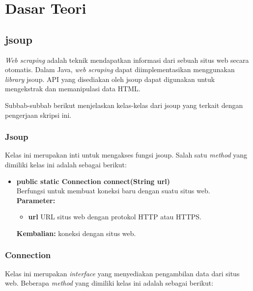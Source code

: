 \chapter{Dasar Teori}
\label{chap:Dasar Teori}

\section{jsoup}
\label{sec:jsoup}

\textit{Web scraping}\cite{Vargiu:2013} adalah teknik mendapatkan informasi dari sebuah situs web secara otomatis. Dalam Java, \textit{web scraping} dapat diimplementasikan menggunakan \textit{library} jsoup\cite{jsoup}. API yang disediakan oleh jsoup dapat digunakan untuk mengekstrak dan memanipulasi data HTML. 

Subbab-subbab berikut menjelaskan kelas-kelas dari jsoup yang terkait dengan pengerjaan skripsi ini.

\subsection{Jsoup}

Kelas ini merupakan inti untuk mengakses fungsi jsoup. Salah satu \textit{method} yang dimiliki kelas ini adalah sebagai berikut:
\begin{itemize}
	\item \textbf{public static Connection connect(String url)} \\
		Berfungsi untuk membuat koneksi baru dengan suatu situs web. \\
		\textbf{Parameter:}
		\begin{itemize}
			\item \textbf{url} URL situs web dengan protokol HTTP atau HTTPS.
		\end{itemize}
		\textbf{Kembalian:} koneksi dengan situs web.
\end{itemize}

\subsection{Connection}

Kelas ini merupakan \textit{interface} yang menyediakan pengambilan data dari situs web. Beberapa \textit{method} yang dimiliki kelas ini adalah sebagai berikut:

